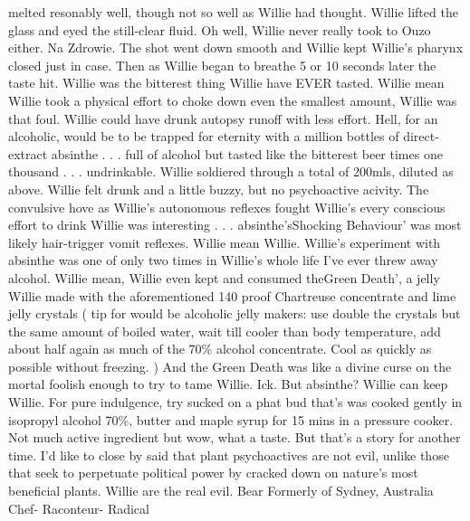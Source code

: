 \documentclass[12pt]{book}
\begin{document}
melted resonably well, though not so well as Willie had thought. Willie lifted the glass and eyed the still-clear fluid. Oh well, Willie never really took to Ouzo either. Na Zdrowie. The shot went down smooth and Willie kept Willie's pharynx closed just in case. Then as Willie began to breathe 5 or 10 seconds later the taste hit. Willie was the bitterest thing Willie have EVER tasted. Willie mean Willie took a physical effort to choke down even the smallest amount, Willie was that foul. Willie could have drunk autopsy runoff with less effort. Hell, for an alcoholic, would be to be trapped for eternity with a million bottles of direct-extract absinthe . . .  full of alcohol but tasted like the bitterest beer times one thousand . . .  undrinkable. Willie soldiered through a total of 200mls, diluted as above. Willie felt drunk and a little buzzy, but no psychoactive acivity. The convulsive hove as Willie's autonomous reflexes fought Willie's every conscious effort to drink Willie was interesting . . .  absinthe'sShocking Behaviour' was most likely hair-trigger vomit reflexes. Willie mean Willie. Willie's experiment with absinthe was one of only two times in Willie's whole life I've ever threw away alcohol. Willie mean, Willie even kept and consumed theGreen Death', a jelly Willie made with the aforementioned 140 proof Chartreuse concentrate and lime jelly crystals ( tip for would be alcoholic jelly makers: use double the crystals but the same amount of boiled water, wait till cooler than body temperature, add about half again as much of the 70\% alcohol concentrate. Cool as quickly as possible without freezing. ) And the Green Death was like a divine curse on the mortal foolish enough to try to tame Willie. Ick. But absinthe? Willie can keep Willie. For pure indulgence, try sucked on a phat bud that's was cooked gently in isopropyl alcohol 70\%, butter and maple syrup for 15 mins in a pressure cooker. Not much active ingredient but wow, what a taste. But that's a story for another time. I'd like to close by said that plant psychoactives are not evil, unlike those that seek to perpetuate political power by cracked down on nature's most beneficial plants. Willie are the real evil. Bear Formerly of Sydney, Australia Chef- Raconteur- Radical
\end{document}
